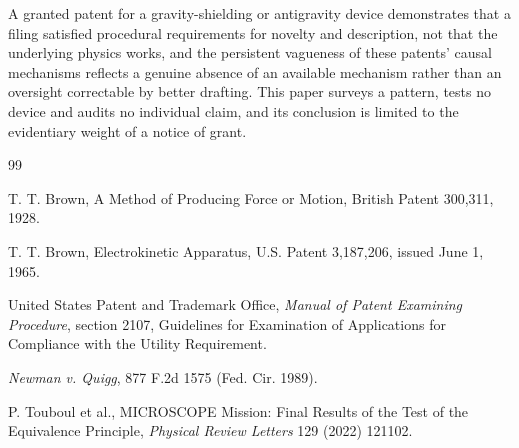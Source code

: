 \documentclass[11pt]{article}
\begin{document}
A granted patent for a gravity-shielding or antigravity device demonstrates that a filing satisfied procedural requirements for novelty and description, not that the underlying physics works, and the persistent vagueness of these patents' causal mechanisms reflects a genuine absence of an available mechanism rather than an oversight correctable by better drafting. This paper surveys a pattern, tests no device and audits no individual claim, and its conclusion is limited to the evidentiary weight of a notice of grant.

\begin{thebibliography}{99}

 T. T. Brown, A Method of Producing Force or Motion, British Patent 300,311, 1928.

 T. T. Brown, Electrokinetic Apparatus, U.S. Patent 3,187,206, issued June 1, 1965.

 United States Patent and Trademark Office, \emph{Manual of Patent Examining Procedure}, section 2107, Guidelines for Examination of Applications for Compliance with the Utility Requirement.

 \emph{Newman v. Quigg}, 877 F.2d 1575 (Fed. Cir. 1989).

 P. Touboul et al., MICROSCOPE Mission: Final Results of the Test of the Equivalence Principle, \emph{Physical Review Letters} 129 (2022) 121102.

\end{thebibliography}
\end{document}

